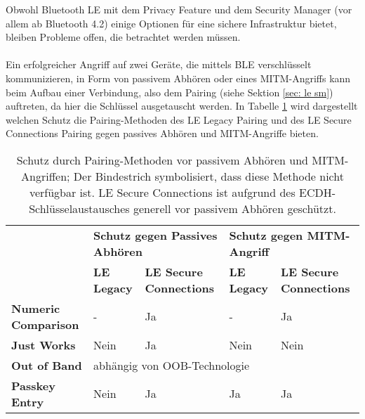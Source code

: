 Obwohl Bluetooth LE mit dem Privacy Feature und dem Security Manager (vor allem ab Bluetooth 4.2) einige Optionen für eine sichere Infrastruktur bietet, bleiben Probleme offen, die betrachtet werden müssen.
\\\\
Ein erfolgreicher Angriff auf zwei Geräte, die mittels BLE verschlüsselt kommunizieren, in Form von passivem Abhören oder eines MITM-Angriffs kann beim Aufbau einer Verbindung, also dem Pairing (siehe Sektion \ref{sec: le sm}) auftreten, da hier die Schlüssel ausgetauscht werden. In Tabelle \ref{tab: le sicherheit zusammenfassung}
wird dargestellt welchen Schutz die Pairing-Methoden des LE Legacy Pairing und des LE Secure Connections Pairing gegen passives Abhören und MITM-Angriffe bieten.

\begin{table}
    \begin{tabularx}{\textwidth}{|p{2.8cm}|p{2cm}|p{3cm}|p{2cm}|p{3cm}|}
        \hline
        & \multicolumn{2}{X|}{\textbf{Schutz gegen Passives Abhören}} & \multicolumn{2}{X|}{\textbf{Schutz gegen MITM-Angriff}} \\
        & \textbf{LE Legacy} & \textbf{LE Secure Connections} & \textbf{LE Legacy} & \textbf{LE Secure Connections} \\
        \hline
        \textbf{Numeric Comparison} & - & Ja & - & Ja \cite{BtSpec4.2_2309} \\
        \hline
        \textbf{Just Works} & Nein \cite{BtSpec4.2_2304_b} & Ja \cite{BtSpec4.2_245} & Nein \cite{BtSpec4.2_2304_b} & Nein \cite{BtSpec4.2_245} \\
        \hline
        \textbf{Out of Band} & \multicolumn{4}{|l|}{abhängig von OOB-Technologie \cite{BtSpec4.2_2305} \cite{BtSpec4.2_2312-2313}} \\
        \hline
        \textbf{Passkey Entry} & Nein \cite{BtSpec4.2_2304} & Ja & Ja \cite{BtSpec4.2_2304} & Ja \cite{BtSpec4.2_2311}\\
        \hline
    \end{tabularx}
    \caption[Schutz durch Pairing-Methoden vor passivem Abhören und MITM]{Schutz durch Pairing-Methoden vor passivem Abhören und MITM-Angriffen; Der Bindestrich symbolisiert, dass diese Methode nicht verfügbar ist. LE Secure Connections ist aufgrund des ECDH-Schlüsselaustausches \cite{BtSpec4.2_2307} generell vor passivem Abhören geschützt.}
    \label{tab: le sicherheit zusammenfassung}
\end{table}

